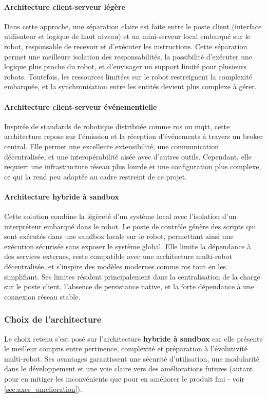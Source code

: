 \paragraph{Architecture client-serveur légère}
Dans cette approche, une séparation claire est faite entre le poste client (interface utilisateur et logique de haut niveau) et un mini-serveur local embarqué sur le robot, responsable de recevoir et d’exécuter les instructions.  
Cette séparation permet une meilleure isolation des responsabilités, la possibilité d’exécuter une logique plus proche du robot, et d’envisager un support limité pour plusieurs robots.  
Toutefois, les ressources limitées sur le robot restreignent la complexité embarquée, et la synchronisation entre les entités devient plus complexe à gérer.

\paragraph{Architecture client-serveur événementielle}
Inspirée de standards de robotique distribuée comme \acrshort{ros} ou \acrshort{mqtt}, cette architecture repose sur l’émission et la réception d’événements à travers un broker central.  
Elle permet une excellente extensibilité, une communication décentralisée, et une interopérabilité aisée avec d’autres outils.  
Cependant, elle requiert une infrastructure réseau plus lourde et une configuration plus complexe, ce qui la rend peu adaptée au cadre restreint de ce projet.

\paragraph{Architecture hybride à sandbox}
Cette solution combine la légèreté d’un système local avec l’isolation d’un interpréteur embarqué dans le robot.  
Le poste de contrôle génère des scripts qui sont exécutés dans une sandbox locale sur le robot, permettant ainsi une exécution sécurisée sans exposer le système global.  
Elle limite la dépendance à des services externes, reste compatible avec une architecture multi-robot décentralisée, et s’inspire des modèles modernes comme \acrshort{ros} tout en les simplifiant.  
Ses limites résident principalement dans la centralisation de la charge sur le poste client, l’absence de persistance native, et la forte dépendance à une connexion réseau stable.

\subsubsection{Choix de l'architecture}
Le choix retenu s'est posé sur l'architecture \textbf{hybride à sandbox} car elle présente le meilleur compris entre pertinence, complexité et préparation à l'évolutivité multi-robot.
Ses avantages garantissent une sécurité d'utilisation, une modularité dans le développement et une voie claire vers des améliorations futures (autant pour en mitiger les inconvénients que pour en améliorer le produit fini - voir \autoref{sec:axes_amelioration}).
